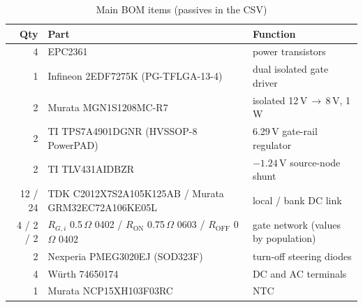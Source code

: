 \documentclass[10pt,a4paper]{article}
\begin{document}
\begin{table}[H]
\centering\small
\caption{Main BOM items (passives in the CSV)}
\begin{tabularx}{\textwidth}{@{}rlX@{}}
\toprule
Qty & Part & Function \\
\midrule
4 & EPC2361 & power transistors \\
1 & Infineon 2EDF7275K (PG-TFLGA-13-4) & dual isolated gate driver \\
2 & Murata MGN1S1208MC-R7 & isolated 12\,V\,$\rightarrow$\,8\,V, 1\,W \\
2 & TI TPS7A4901DGNR (HVSSOP-8 PowerPAD) & 6.29\,V gate-rail regulator \\
2 & TI TLV431AIDBZR & $-1.24$\,V source-node shunt \\
12 / 24 & TDK C2012X7S2A105K125AB / Murata GRM32EC72A106KE05L & local / bank DC link \\
4 / 2 / 2 & $R_{G,i}$ 0.5\,$\Omega$ 0402 / $R_\mathrm{ON}$ 0.75\,$\Omega$ 0603 / $R_\mathrm{OFF}$ 0\,$\Omega$ 0402 & gate network (values by population) \\
2 & Nexperia PMEG3020EJ (SOD323F) & turn-off steering diodes \\
4 & W\"urth 74650174 & DC and AC terminals \\
1 & Murata NCP15XH103F03RC & NTC \\
\bottomrule
\end{tabularx}
\end{table}
\end{document}
